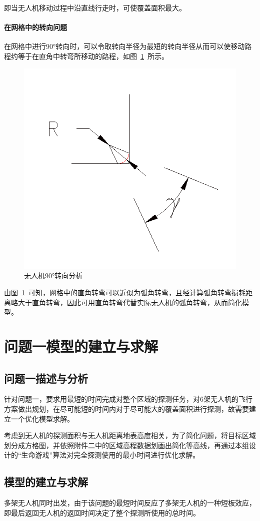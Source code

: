 \documentclass{whutmod}
\begin{document}
	即当无人机移动过程中沿直线行走时，可使覆盖面积最大。
	
	\paragraph{在网格中的转向问题}
	在网格中进行90°转向时，可以令取转向半径为最短的转向半径从而可以使移动路程约等于在直角中转弯所移动的路程，如图~\ref{90zhuan}~所示。

	\begin{figure}[H]
		\centering
		\includegraphics[width=.5\textwidth]{figures/90zhuan.png}
		\caption{无人机90°转向分析}\label{90zhuan}
	\end{figure}

	由图~\ref{90zhuan}~可知，网格中的直角转弯可以近似为弧角转弯，且经计算弧角转弯损耗距离略大于直角转弯，因此可用直角转弯代替实际无人机的弧角转弯，从而简化模型。

	
	\section{问题一模型的建立与求解}
	\subsection{问题一描述与分析}
	针对问题一，要求用最短的时间完成对整个区域的探测任务，对6架无人机的飞行方案做出规划，在尽可能短的时间内对于尽可能大的覆盖面积进行探测，故需要建立一个优化模型求解。
	
	考虑到无人机的探测面积与无人机距离地表高度相关，为了简化问题，将目标区域划分成方格图，并依照附件二中的区域高程数据划画出简化等高线，再通过本组设计的“生命游戏”算法对完全探测使用的最小时间进行优化求解。

	\subsection{模型的建立与求解}
	多架无人机同时出发，由于该问题的最短时间反应了多架无人机的一种短板效应，即最后返回无人机的返回时间决定了整个探测所使用的总时间。
	
\end{document}
